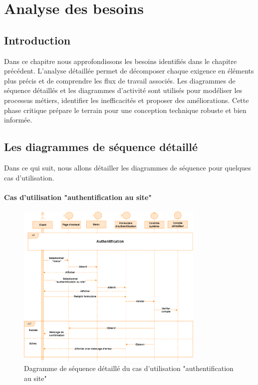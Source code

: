 \documentclass[edit,12pt,a4paper,ChapStyle,oneside,doubleinterligne]{report}
\begin{document}
\chapter{Analyse des besoins}
\section{Introduction}
Dans ce chapitre nous approfondissons les besoins identifiés dans le chapitre précédent. L'analyse détaillée permet de décomposer chaque exigence en éléments plus précis et de comprendre les flux de travail associés. Les diagrammes de séquence détaillés et les diagrammes d'activité sont utilisés pour modéliser les processus métiers, identifier les inefficacités et proposer des améliorations. Cette phase critique prépare le terrain pour une conception technique robuste et bien informée.

\section{Les diagrammes de séquence détaillé}
Dans ce qui suit, nous allons détailler les diagrammes de séquence pour quelques cas d'utilisation.
\subsubsection{Cas d'utilisation "authentification au site"}
\begin{figure}[H]\label{fig:Authentification au site}
\centering
\includegraphics[width=0.8\textwidth]{images/Authentification au site.png}
\caption{Dagramme de séquence détaillé du cas d'utilisation "authentification au site"}
\end{figure}
\clearpage
\end{document}
